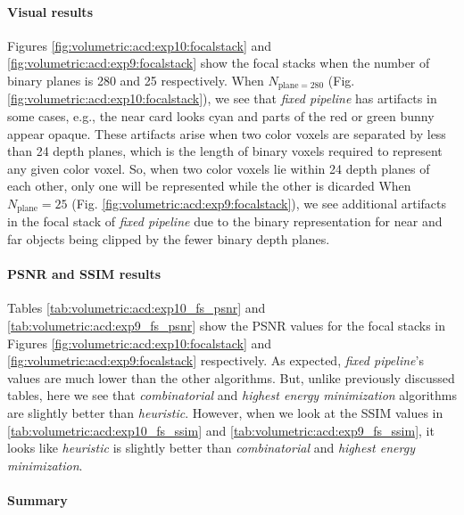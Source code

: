 \paragraph{Visual results}
Figures \ref{fig:volumetric:acd:exp10:focalstack} and \ref{fig:volumetric:acd:exp9:focalstack} show the focal stacks when the number of binary planes is 280 and 25 respectively. 
When $N_{\text{plane}=280}$ (Fig. \ref{fig:volumetric:acd:exp10:focalstack}), we see that \emph{fixed pipeline} has artifacts in some cases, e.g., the near card looks cyan and parts of the red or green bunny appear opaque. 
These artifacts arise when two color voxels are separated by less than 24 depth planes, which is the length of binary voxels required to represent any given color voxel. So, when two color voxels lie within 24 depth planes of each other, only one will be represented while the other is dicarded
When $N_{\text{plane}}=25$ (Fig. \ref{fig:volumetric:acd:exp9:focalstack}), we see additional artifacts in the focal stack of \emph{fixed pipeline} due to the binary representation for near and far objects being clipped by the fewer binary depth planes.  

\paragraph{PSNR and SSIM results}




Tables \ref{tab:volumetric:acd:exp10_fs_psnr} and \ref{tab:volumetric:acd:exp9_fs_psnr} show the PSNR values for the focal stacks in Figures \ref{fig:volumetric:acd:exp10:focalstack} and \ref{fig:volumetric:acd:exp9:focalstack} respectively. As expected, \emph{fixed pipeline}'s values are much lower than the other algorithms. But, unlike previously discussed tables, here we see that \emph{combinatorial} and \emph{highest energy minimization} algorithms are slightly better than \emph{heuristic}. However, when we look at the SSIM values in \ref{tab:volumetric:acd:exp10_fs_ssim} and \ref{tab:volumetric:acd:exp9_fs_ssim}, it looks like \emph{heuristic} is slightly better than \emph{combinatorial} and \emph{highest energy minimization}.

\paragraph{Summary}

